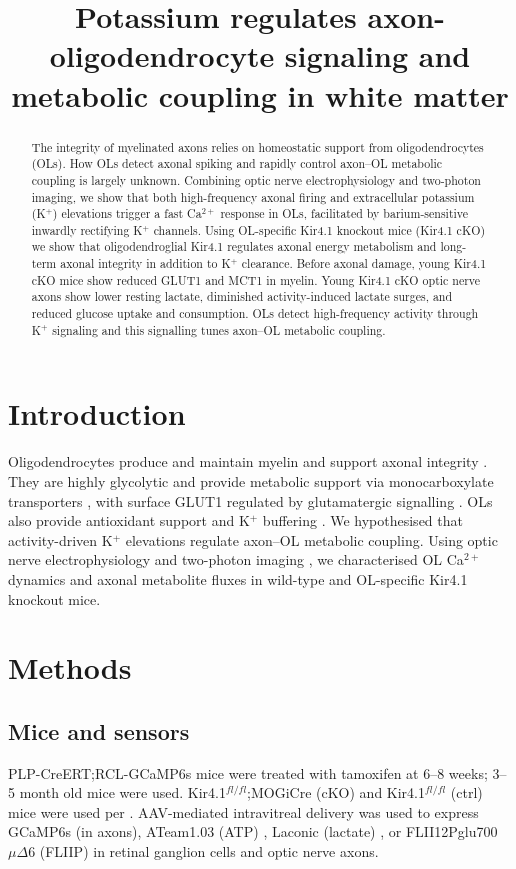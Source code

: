 \documentclass[11pt]{article}
\title{Potassium regulates axon-oligodendrocyte signaling and metabolic coupling in white matter}
\author{}
\date{}
\begin{document}
\maketitle

\begin{abstract}
The integrity of myelinated axons relies on homeostatic support from oligodendrocytes (OLs). How OLs detect axonal spiking and rapidly control axon--OL metabolic coupling is largely unknown. Combining optic nerve electrophysiology and two-photon imaging, we show that both high-frequency axonal firing and extracellular potassium (K$^+$) elevations trigger a fast Ca$^{2+}$ response in OLs, facilitated by barium-sensitive inwardly rectifying K$^+$ channels. Using OL-specific Kir4.1 knockout mice (Kir4.1 cKO) we show that oligodendroglial Kir4.1 regulates axonal energy metabolism and long-term axonal integrity in addition to K$^+$ clearance. Before axonal damage, young Kir4.1 cKO mice show reduced GLUT1 and MCT1 in myelin. Young Kir4.1 cKO optic nerve axons show lower resting lactate, diminished activity-induced lactate surges, and reduced glucose uptake and consumption. OLs detect high-frequency activity through K$^+$ signaling and this signalling tunes axon--OL metabolic coupling.
\end{abstract}

\section{Introduction}
Oligodendrocytes produce and maintain myelin and support axonal integrity \citep{r1,r2,r3,r4,r5,r6,r7,r8}. They are highly glycolytic and provide metabolic support via monocarboxylate transporters \citep{r9,r10,r11}, with surface GLUT1 regulated by glutamatergic signalling \citep{r12}. OLs also provide antioxidant support \citep{r21} and K$^+$ buffering \citep{r22,r23}. We hypothesised that activity-driven K$^+$ elevations regulate axon--OL metabolic coupling. Using optic nerve electrophysiology and two-photon imaging \citep{r24,r25}, we characterised OL Ca$^{2+}$ dynamics and axonal metabolite fluxes in wild-type and OL-specific Kir4.1 knockout mice.

\section{Methods}
\subsection{Mice and sensors}
PLP-CreERT;RCL-GCaMP6s mice \citep{r26,r27,r28} were treated with tamoxifen at 6--8 weeks; 3--5 month old mice were used. Kir4.1$^{fl/fl}$;MOGiCre (cKO) and Kir4.1$^{fl/fl}$ (ctrl) mice were used per \citep{r22}. AAV-mediated intravitreal delivery was used to express GCaMP6s (in axons), ATeam1.03 (ATP) \citep{r47}, Laconic (lactate) \citep{r49}, or FLII12Pglu700$\mu\Delta$6 (FLIIP) \citep{r51} in retinal ganglion cells and optic nerve axons.
\end{document}
